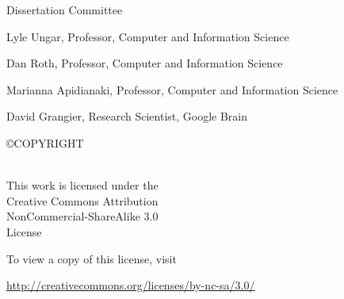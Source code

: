 \begin{titlepage}
\begin{flushleft}
\doublespacing

Dissertation Committee %

Lyle Ungar, Professor, Computer and Information Science

Dan Roth, Professor, Computer and Information Science

Marianna Apidianaki, Professor, Computer and Information Science

David Grangier, Research Scientist, Google Brain

\end{flushleft}

\end{titlepage}


\doublespacing

\thispagestyle{empty} %

\vspace*{\fill}

\begin{flushleft}
\mytitle

 \copyright \space COPYRIGHT
 
\myyear

\myauthorfull\\[24 pt] %

This work is licensed under the \\
Creative Commons Attribution \\
NonCommercial-ShareAlike 3.0 \\
License

To view a copy of this license, visit

\url{http://creativecommons.org/licenses/by-nc-sa/3.0/}

\end{flushleft}
\pagebreak 



